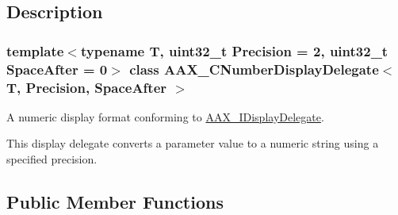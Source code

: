 \subsection{Description}
\subsubsection*{template$<$typename T, uint32\+\_\+t Precision = 2, uint32\+\_\+t Space\+After = 0$>$\newline
class A\+A\+X\+\_\+\+C\+Number\+Display\+Delegate$<$ T, Precision, Space\+After $>$}

A numeric display format conforming to \mbox{\hyperlink{a01801}{A\+A\+X\+\_\+\+I\+Display\+Delegate}}. 

This display delegate converts a parameter value to a numeric string using a specified precision. \subsection*{Public Member Functions}
